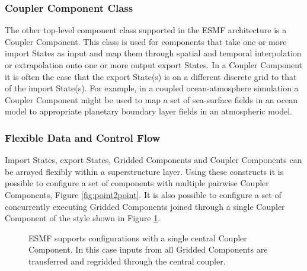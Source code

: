 \subsubsection{Coupler Component Class}
The other top-level component class supported in the ESMF architecture is a Coupler Component.
This class is used for components that take one or more import States as input and map them through
spatial and temporal interpolation or extrapolation onto one or more output export States. In a Coupler Component
it is often the case that the export State(s) is on a different discrete grid to that of
the import State(s). For example, in a coupled
ocean-atmosphere simulation a Coupler Component might be used to map a set of sea-surface fields 
in an ocean model to appropriate planetary boundary layer fields in an atmospheric model.

\subsubsection{Flexible Data and Control Flow}
Import States, export States, Gridded Components and Coupler Components can be arrayed flexibly
within a superstructure layer. Using these constructs it is possible to 
configure a set of components with multiple
pairwise Coupler Components, Figure \ref{fig:point2point}.  It is also
possible to configure a set of concurrently
executing Gridded Components joined through a single Coupler Component of the style shown in Figure \ref{fig:hubspoke}. 

\begin{figure}
\caption{ESMF supports configurations with a single central Coupler Component. In this case inputs from all Gridded 
Components are transferred and regridded through the central coupler.}
\label{fig:hubspoke}
\end{figure}

